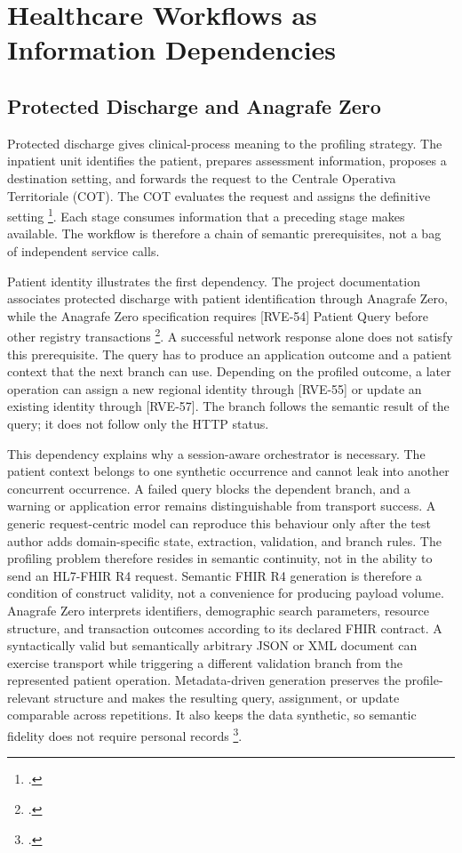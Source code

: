 \section{Healthcare Workflows as Information Dependencies}
\label{sec:interoperability-transactions}
\subsection{Protected Discharge and Anagrafe Zero}
\label{subsec:fhir-r4}

\noindent Protected discharge gives clinical-process meaning to the profiling
strategy. The inpatient unit identifies the patient, prepares assessment
information, proposes a destination setting, and forwards the request to the
Centrale Operativa Territoriale (COT). The COT evaluates the request and assigns
the definitive setting \footcites{rti-siter-relazione-tecnica}{azienda-zero-siter-capitolato}.
Each stage consumes information that a preceding stage makes available. The workflow is therefore a
chain of semantic prerequisites, not a bag of independent service calls.

\noindent Patient identity illustrates the first dependency. The project documentation
associates protected discharge with patient identification through Anagrafe Zero,
while the Anagrafe Zero specification requires [RVE-54] Patient Query before other
registry transactions \footcite{arsenal-anagrafe-zero-v26}. A successful network
response alone does not satisfy this prerequisite. The query has to produce an
application outcome and a patient context that the next branch can use. Depending
on the profiled outcome, a later operation can assign a new regional identity
through [RVE-55] or update an existing identity through [RVE-57]. The branch follows
the semantic result of the query; it does not follow only the HTTP status.

\noindent This dependency explains why a session-aware orchestrator is necessary. The
patient context belongs to one synthetic occurrence and cannot leak into another
concurrent occurrence. A failed query blocks the dependent branch, and a warning
or application error remains distinguishable from transport success. A generic
request-centric model can reproduce this behaviour only after the test author adds
domain-specific state, extraction, validation, and branch rules. The profiling
problem therefore resides in semantic continuity, not in the ability to send an
HL7-FHIR R4 request. Semantic FHIR R4 generation is therefore a condition of construct validity,
not a convenience for producing payload volume. Anagrafe Zero interprets
identifiers, demographic search parameters, resource structure, and transaction
outcomes according to its declared FHIR contract. A syntactically valid but
semantically arbitrary JSON or XML document can exercise transport while
triggering a different validation branch from the represented patient operation.
Metadata-driven generation preserves the profile-relevant structure and makes
the resulting query, assignment, or update comparable across repetitions. It
also keeps the data synthetic, so semantic fidelity does not require personal
records \footcite{arsenal-anagrafe-zero-v26}.

